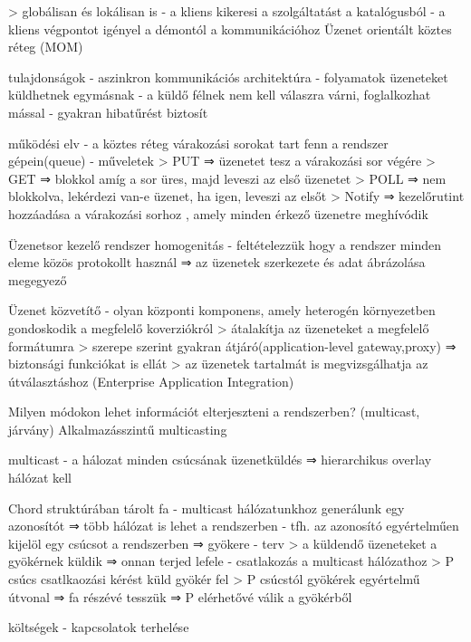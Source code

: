 \documentclass[12pt]{article}
\begin{document}
\begin{description}
        > globálisan és lokálisan is
        - a kliens kikeresi a szolgáltatást a katalógusból
        - a kliens végpontot igényel a démontól a kommunikációhoz
        Üzenet orientált köztes réteg (MOM)
    \item tulajdonságok
        - aszinkron kommunikációs architektúra
        - folyamatok üzeneteket küldhetnek egymásnak
        - a küldő félnek nem kell válaszra várni, foglalkozhat mással
        - gyakran hibatűrést biztosít
    \item működési elv
        - a köztes réteg várakozási sorokat tart fenn a rendszer gépein(queue)
        - műveletek
        > PUT    ⇒ üzenetet tesz a várakozási sor végére
        > GET    ⇒ blokkol amíg a sor üres, majd leveszi az első üzenetet
        > POLL 	 ⇒ nem blokkolva, lekérdezi van-e üzenet, ha igen, leveszi az elsőt
        > Notify ⇒	kezelőrutint hozzáadása a várakozási sorhoz , amely minden érkező üzenetre meghívódik
    \item Üzenetsor kezelő rendszer homogenitás
        - feltételezzük hogy a rendszer minden eleme közös protokollt használ
        ⇒ az üzenetek szerkezete és adat ábrázolása megegyező
    \item Üzenet közvetítő
        - olyan központi komponens, amely heterogén környezetben gondoskodik a megfelelő koverziókról
        > átalakítja az üzeneteket a megfelelő formátumra
        > szerepe szerint gyakran átjáró(application-level gateway,proxy) ⇒ biztonsági funkciókat is ellát
        > az üzenetek tartalmát is megvizsgálhatja az útválasztáshoz (Enterprise Application Integration)	
    \item  Milyen módokon lehet információt elterjeszteni a rendszerben? (multicast, járvány)
        Alkalmazásszintű multicasting
    \item multicast 
        - a hálozat minden csúcsának üzenetküldés
        ⇒ hierarchikus overlay hálózat kell
    \item Chord struktúrában tárolt fa
        - multicast hálózatunkhoz generálunk egy azonosítót ⇒ több hálózat is lehet a rendszerben
        - tfh. az azonosító egyértelműen kijelöl egy csúcsot a rendszerben ⇒ gyökere
        - terv
        > a küldendő üzeneteket a gyökérnek küldik ⇒ onnan terjed lefele
        - csatlakozás a multicast hálózathoz
        > P csúcs csatlkaozási kérést küld gyökér fel
        > P csúcstól gyökérek egyértelmű útvonal ⇒ fa részévé tesszük
        ⇒ P elérhetővé válik a gyökérből
    \item költségek
        - kapcsolatok terhelése

\end{description}
\end{document}
